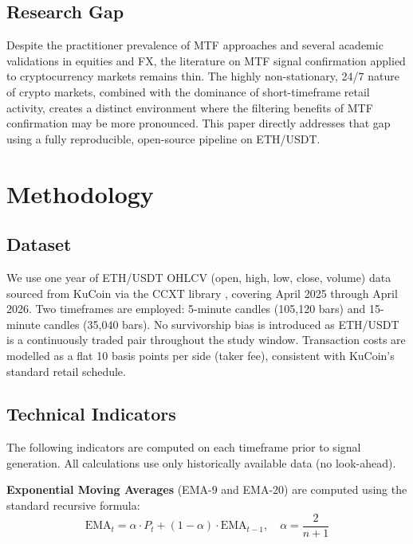 \documentclass[conference]{IEEEtran}
\begin{document}
\subsection{Research Gap}

Despite the practitioner prevalence of MTF approaches and
several academic validations in equities and FX, the
literature on MTF signal confirmation applied to
cryptocurrency markets remains thin. The highly
non-stationary, 24/7 nature of crypto markets, combined
with the dominance of short-timeframe retail activity,
creates a distinct environment where the filtering
benefits of MTF confirmation may be more pronounced.
This paper directly addresses that gap using a
fully reproducible, open-source pipeline on ETH/USDT.


\section{Methodology}
\label{sec:method}

\subsection{Dataset}

We use one year of ETH/USDT OHLCV (open, high, low,
close, volume) data sourced from KuCoin via the CCXT
library \cite{ccxt}, covering April 2025 through April
2026. Two timeframes are employed: 5-minute candles
(105,120 bars) and 15-minute candles (35,040 bars). No
survivorship bias is introduced as ETH/USDT is a
continuously traded pair throughout the study window.
Transaction costs are modelled as a flat 10 basis points
per side (taker fee), consistent with KuCoin's standard
retail schedule.

\subsection{Technical Indicators}

The following indicators are computed on each timeframe
prior to signal generation. All calculations use only
historically available data (no look-ahead).

\textbf{Exponential Moving Averages} (EMA-9 and EMA-20)
are computed using the standard recursive formula:
\begin{equation}
  \mathrm{EMA}_t = \alpha \cdot P_t + (1-\alpha) \cdot \mathrm{EMA}_{t-1},
  \quad \alpha = \frac{2}{n+1}
  \label{eq:ema}
\end{equation}
\end{document}
